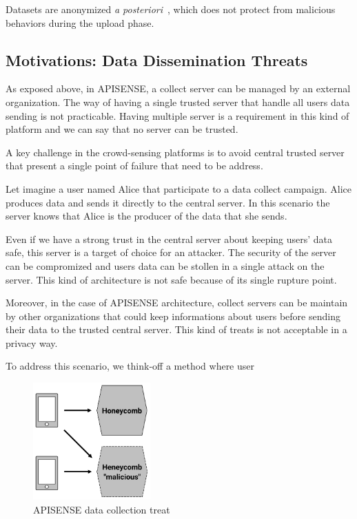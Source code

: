 Datasets are anonymized \emph{a posteriori}~\cite{DBLP:conf/icdcs/PrimaultMB15}, which does not protect from malicious behaviors during the upload phase.

\subsection{Motivations: Data Dissemination Threats}

As exposed above, in APISENSE, a collect server can be managed by an external organization.
The way of having a single trusted server that handle all users data sending is not practicable.
Having multiple server is a requirement in this kind of platform and we can say that no server can be trusted.

A key challenge in the crowd-sensing platforms is to avoid central trusted server that present a single point of failure that need to be address.

Let imagine a user named Alice that participate to a data collect campaign.
Alice produces data and sends it directly to the central server.
In this scenario the server knows that Alice is the producer of the data that she sends.

Even if we have a strong trust in the central server about keeping users' data safe, this server is a target of choice for an attacker.
The security of the server can be compromized and users data can be stollen in a single attack on the server.
This kind of architecture is not safe because of its single rupture point.

Moreover, in the case of APISENSE architecture, collect servers can be maintain by other organizations that could keep informations about users before sending their data to the trusted central server.
This kind of treats is not acceptable in a privacy way.

To address this scenario, we think-off a method where user 

\begin{figure}[t]
	\centering
	\includegraphics[width=0.4\textwidth]{figures/honeycomb}
	\caption{\label{Honeycomb} APISENSE data collection treat}
\end{figure}

